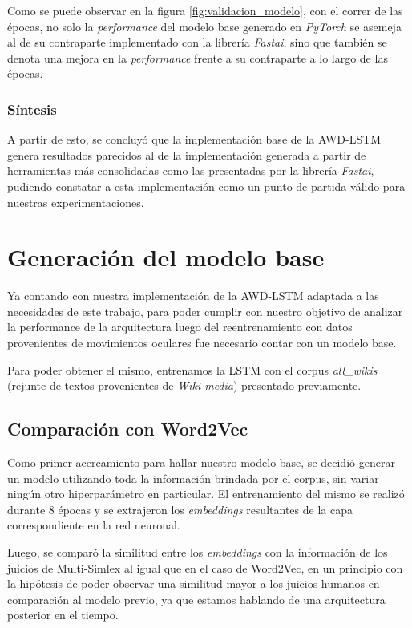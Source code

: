 Como se puede observar en la figura \ref{fig:validacion_modelo}, con el correr de las épocas, no solo la 
\textit{performance} del modelo base generado en \textit{PyTorch} se asemeja al de su contraparte 
implementado con la librería \textit{Fastai}, sino que también se denota una mejora en la 
\textit{performance} frente a su contraparte a lo largo de las épocas.

\subsubsection{Síntesis}

A partir de esto, se concluyó que la implementación base de la AWD-LSTM genera resultados 
parecidos al de la implementación generada a partir de herramientas más consolidadas 
como las presentadas por la librería \textit{Fastai}, pudiendo constatar a esta implementación 
como un punto de partida válido para nuestras experimentaciones.

\section{Generación del modelo base}

Ya contando con nuestra implementación de la AWD-LSTM adaptada a las necesidades de este 
trabajo, para poder cumplir con nuestro objetivo de analizar la performance de la 
arquitectura luego del reentrenamiento con datos provenientes de movimientos oculares 
fue necesario contar con un modelo base.

Para poder obtener el mismo, entrenamos la LSTM con el corpus \textit{all\_wikis} (rejunte de textos 
provenientes de \textit{Wiki-media}) presentado previamente.

\subsection{Comparación con Word2Vec}

Como primer acercamiento para hallar nuestro modelo base, se decidió generar un modelo 
utilizando toda la información brindada por el corpus, sin variar ningún otro hiperparámetro 
en particular. El entrenamiento del mismo se realizó durante 8 épocas y se extrajeron los 
\textit{embeddings} resultantes de la capa correspondiente en la red neuronal.

Luego, se comparó la similitud entre los \textit{embeddings} con la información de los juicios de 
Multi-Simlex al igual que en el caso de Word2Vec, en un principio con la hipótesis de 
poder observar una similitud mayor a los juicios humanos en comparación al modelo previo, 
ya que estamos hablando de una arquitectura posterior en el tiempo.

